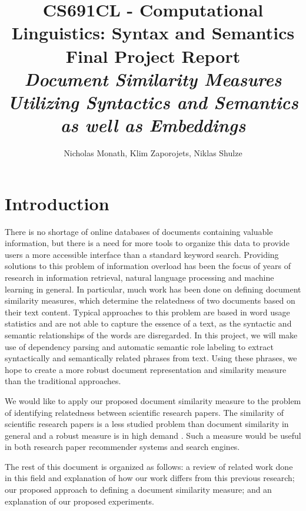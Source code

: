 \documentclass[11pt]{article}
\begin{document}
  \title{CS691CL - Computational Linguistics: Syntax and Semantics \\ Final Project Report \\ \vspace{1cm} \emph{Document Similarity Measures \\ Utilizing Syntactics and Semantics \\ as well as Embeddings}}
  \author{Nicholas Monath,  Klim Zaporojets, Niklas Shulze}
  \maketitle
  
  
  
\section{Introduction}

There is no shortage of online databases of documents containing valuable information, but there is a need for more tools to organize this data to provide users a more accessible interface than a standard keyword search. Providing solutions to this problem of information overload has been the focus of years of research in information retrieval, natural language processing and machine learning in general. In particular, much work has been done on defining document similarity measures, which determine the relatedness of two documents based on their text content. Typical approaches to this problem are based in word usage statistics and are not able to capture the essence of a text, as the syntactic and semantic relationships of the words are disregarded. In this project, we will make use of dependency parsing and automatic semantic role labeling to extract syntactically and semantically related phrases from text. Using these phrases, we hope to create a more robust document representation and similarity measure than the traditional approaches. 

We would like to apply our proposed document similarity measure to the problem of identifying relatedness between scientific research papers. The similarity of scientific research papers is a less studied problem than document similarity in general and a robust measure is in high demand \cite{Hurtado2013}. Such a measure would be useful in both research paper recommender systems and search engines. 

The rest of this document is organized as follows: a review of related work done in this field and explanation of how our work differs from this previous research; our proposed approach to defining a document similarity measure; and an explanation of our proposed experiments.
\end{document}
